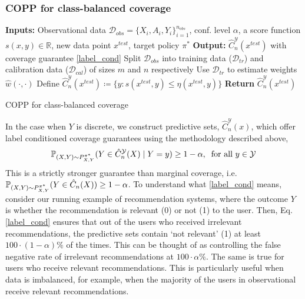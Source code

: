 \subsubsection{COPP for class-balanced coverage}
\begin{algorithm}
\SetAlgoLined
\textbf{Inputs:} Observational data $\mathcal{D}_{obs}=\{X_i, A_i, Y_i\}_{i=1}^{n_{obs}}$, conf. level $\alpha$, a score function $s(x,y)\in\mathbb{R}$, new data point $x^{test}$, target policy $\pi^*$ \;
\textbf{Output:} $\hat{C}^{\mathcal{Y}}_n(x^{test})$ with coverage guarantee \eqref{label_cond}\;
Split $\mathcal{D}_{obs}$ into training data ($\mathcal{D}_{tr}$) and calibration data ($\mathcal{D}_{cal}$) of sizes $m$ and $n$ respectively\;
Use $\mathcal{D}_{tr}$ to estimate weights $\hat{w}(\cdot, \cdot)$\;
Define $\hat{C}^{\mathcal{Y}}_n(x^{test}) \coloneqq  \{y: s(x^{test},y) \leq \eta(x^{test}, y) \} $\;
\textbf{Return} $\hat{C}^{\mathcal{Y}}_n(x^{test})$
\caption{COPP for class-balanced coverage}
  \label{cp_label_conditioned}
\end{algorithm}
In the case when $Y$ is discrete, we construct predictive sets, $\hat{C}^{\mathcal{Y}}_n(x)$, which offer label conditioned coverage guarantees using the methodology described above,
\begin{align}
    \mathbb{P}_{(X,Y)\sim P^{\pi^*}_{X,Y}}(Y \in \hat{C}^{\mathcal{Y}}_n(X) \mid Y = y) \geq 1- \alpha, \hspace{0.2cm} \textup{for all $y\in \mathcal{Y}$} \label{label_cond}
\end{align}
This is a strictly stronger guarantee than marginal coverage, i.e. $\mathbb{P}_{(X,Y)\sim P^{\pi^*}_{X,Y}}(Y \in \hat{C}_n(X)) \geq 1- \alpha$. To understand what \eqref{label_cond} means, consider our running example of recommendation systems, where the outcome $Y$ is whether the recommendation is relevant (0) or not (1) to the user. Then, Eq. \eqref{label_cond} ensures that out of the users who received irrelevant recommendations, the predictive sets contain `not relevant' (1) at least $100\cdot(1-\alpha)\%$ of the times. This can be thought of as controlling the false negative rate of irrelevant recommendations at $100\cdot\alpha\%$. The same is true for users who receive relevant recommendations. This is particularly useful when data is imbalanced, for example, when the majority of the users in observational receive relevant recommendations. 

